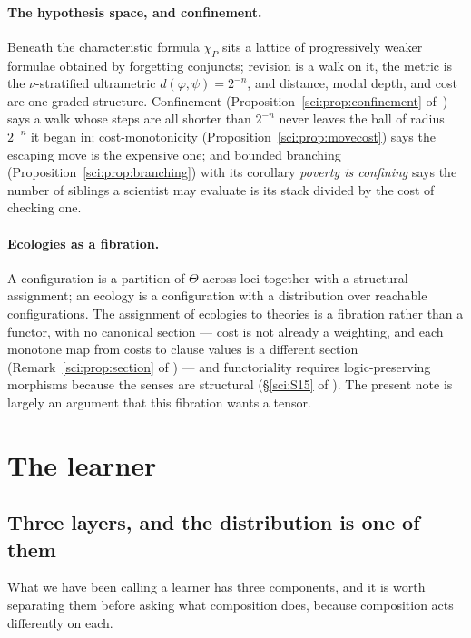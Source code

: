 \paragraph{The hypothesis space, and confinement.}
Beneath the characteristic formula $\chi_P$ sits a lattice of progressively weaker formulae
obtained by forgetting conjuncts; revision is a walk on it, the metric is the $\nu$-stratified
ultrametric $d(\varphi,\psi) = 2^{-n}$, and distance, modal depth, and cost are one graded
structure. Confinement (Proposition~\ref{sci:prop:confinement} of~\chSci) says a walk whose steps are all
shorter than $2^{-n}$ never leaves the ball of radius $2^{-n}$ it began in; cost-monotonicity
(Proposition~\ref{sci:prop:movecost}) says the escaping move is the expensive one; and bounded branching
(Proposition~\ref{sci:prop:branching}) with its corollary \emph{poverty is confining} says the number of siblings a
scientist may evaluate is its stack divided by the cost of checking one.

\paragraph{Ecologies as a fibration.}
A configuration is a partition of $\Theta$ across loci together with a structural assignment; an
ecology is a configuration with a distribution over reachable configurations. The assignment of
ecologies to theories is a fibration rather than a functor, with no canonical section --- cost is
not already a weighting, and each monotone map from costs to clause values is a different section
(Remark~\ref{sci:prop:section} of \chSci) --- and functoriality requires logic-preserving morphisms
because the senses are structural (\S\ref{sci:S15} of \chSci). The present note is largely an argument that this
fibration wants a tensor.

\section{The learner}\label{com:sec:learner}\label{com:S3}

\subsection{Three layers, and the distribution is one of them}\label{com:S3.1}

What we have been calling a learner has three components, and it is worth separating them before
asking what composition does, because composition acts differently on each.

